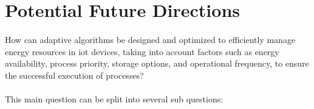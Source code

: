 \documentclass[12pt,a4paper]{article}
\begin{document}
    \section{Potential Future Directions}

        \paragraph{}
        How can adaptive algorithms be designed and optimized to efficiently manage energy resources in \gls{iot} devices, taking into account factors such as energy availability, process priority, storage options, and operational frequency, to ensure the successful execution of processes?

        \paragraph{}
        This main question can be split into several sub questions:
\end{document}
